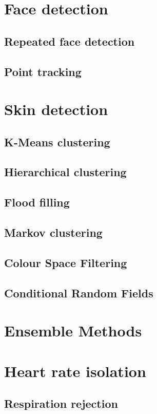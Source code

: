 \section{Face detection}
\subsection{Repeated face detection}
\subsection{Point tracking}

\section{Skin detection}
\subsection{K-Means clustering}
\subsection{Hierarchical clustering}
\subsection{Flood filling}
\subsection{Markov clustering}
\subsection{Colour Space Filtering}
\subsection{Conditional Random Fields}

\section{Ensemble Methods}

\section{Heart rate isolation}
\subsection{Respiration rejection}

\section{}